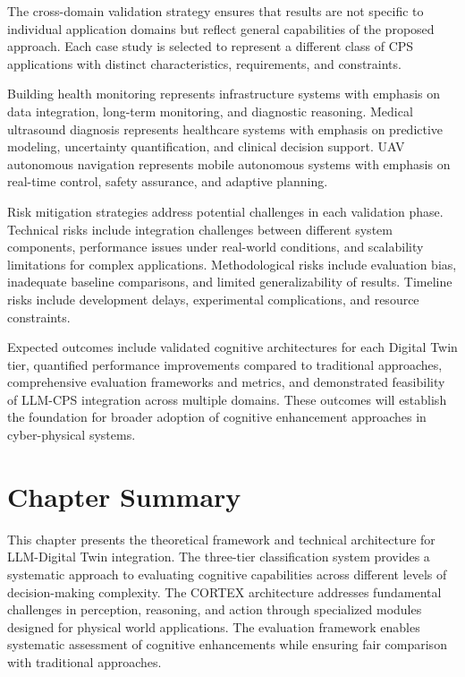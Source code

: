 The cross-domain validation strategy ensures that results are not specific to individual application domains but reflect general capabilities of the proposed approach. Each case study is selected to represent a different class of CPS applications with distinct characteristics, requirements, and constraints.

Building health monitoring represents infrastructure systems with emphasis on data integration, long-term monitoring, and diagnostic reasoning. Medical ultrasound diagnosis represents healthcare systems with emphasis on predictive modeling, uncertainty quantification, and clinical decision support. UAV autonomous navigation represents mobile autonomous systems with emphasis on real-time control, safety assurance, and adaptive planning.

Risk mitigation strategies address potential challenges in each validation phase. Technical risks include integration challenges between different system components, performance issues under real-world conditions, and scalability limitations for complex applications. Methodological risks include evaluation bias, inadequate baseline comparisons, and limited generalizability of results. Timeline risks include development delays, experimental complications, and resource constraints.

Expected outcomes include validated cognitive architectures for each Digital Twin tier, quantified performance improvements compared to traditional approaches, comprehensive evaluation frameworks and metrics, and demonstrated feasibility of LLM-CPS integration across multiple domains. These outcomes will establish the foundation for broader adoption of cognitive enhancement approaches in cyber-physical systems.

\section{Chapter Summary}

This chapter presents the theoretical framework and technical architecture for LLM-Digital Twin integration. The three-tier classification system provides a systematic approach to evaluating cognitive capabilities across different levels of decision-making complexity. The CORTEX architecture addresses fundamental challenges in perception, reasoning, and action through specialized modules designed for physical world applications. The evaluation framework enables systematic assessment of cognitive enhancements while ensuring fair comparison with traditional approaches.